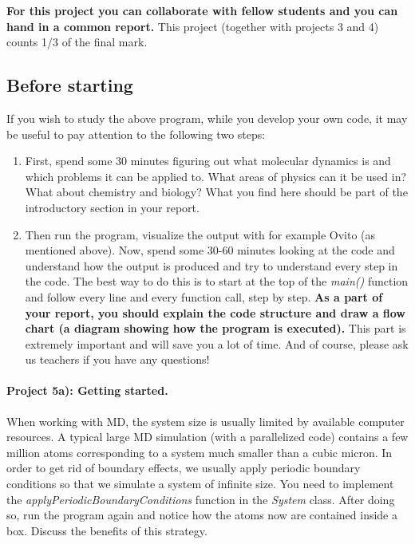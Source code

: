 \documentclass[%
oneside,                 %
final,                   %
10pt]{article}
\begin{document}
\textbf{For this project you can collaborate with fellow students and you can  hand in a common report.}
This project (together with projects 3 and 4) counts 1/3 of the final mark.

\subsection{Before starting}

If you wish to study the above program, while you develop your own code, it may be useful to 
pay attention to the following two steps:
\begin{enumerate}
 \item First, spend some 30 minutes figuring out what molecular dynamics is and which problems it can be applied to. What areas of physics can it be used in? What about chemistry and biology? What you find here should be part of the  introductory section in your report.

 \item Then run the program, visualize the output with for example Ovito (as mentioned above). Now, spend some 30-60 minutes looking at the code and understand how the output is produced and try to understand every step in the code. The best way to do this is to start at the top of the \emph{main()} function and follow every line and every function call, step by step. \textbf{As a part of your report, you should explain the code structure and draw a flow chart (a diagram showing how the program is executed).} This part is extremely important and will save you a lot of time. And of course, please ask us teachers if you have any questions!
\end{enumerate}

\noindent
\paragraph{Project 5a): Getting started.}
When working with MD, the system size is usually limited by available computer resources. A typical large MD simulation (with a parallelized code) contains a few million atoms corresponding to a system much smaller than a cubic micron. In order to get rid of boundary effects, we usually apply periodic boundary conditions so that we simulate a system of infinite size. You need to implement the \emph{applyPeriodicBoundaryConditions} function in the \emph{System} class. After doing so, run the program again and notice how the atoms now are contained inside a box. Discuss the benefits of this strategy.
\end{document}
